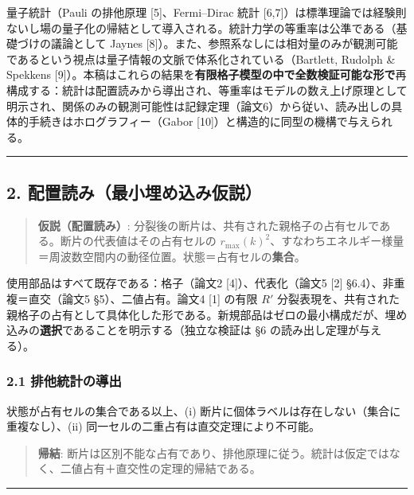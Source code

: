 \documentclass[
]{ltjsarticle}
\begin{document}
量子統計（Pauli の排他原理 {[}5{]}、Fermi--Dirac 統計
{[}6,7{]}）は標準理論では経験則ないし場の量子化の帰結として導入される。統計力学の等重率は公準である（基礎づけの議論として
Jaynes
{[}8{]}）。また、参照系なしには相対量のみが観測可能であるという視点は量子情報の文脈で体系化されている（Bartlett,
Rudolph \& Spekkens
{[}9{]}）。本稿はこれらの結果を\textbf{有限格子模型の中で全数検証可能な形で}再構成する：統計は配置読みから導出され、等重率はモデルの数え上げ原理として明示され、関係のみの観測可能性は記録定理（論文6）から従い、読み出しの具体的手続きはホログラフィー（Gabor
{[}10{]}）と構造的に同型の機構で与えられる。

\begin{center}\rule{0.5\linewidth}{0.5pt}\end{center}

\subsection{2.
配置読み（最小埋め込み仮説）}\label{ux914dux7f6eux8aadux307fux6700ux5c0fux57cbux3081ux8fbcux307fux4eeeux8aac}

\begin{quote}
\textbf{仮説（配置読み）}:
分裂後の断片は、共有された親格子の占有セルである。断片の代表値はその占有セルの
\(r_{\max}(k)^2\)、すなわちエネルギー様量＝周波数空間内の動径位置。状態＝占有セルの\textbf{集合}。
\end{quote}

使用部品はすべて既存である：格子（論文2 {[}4{]}）、代表化（論文5 {[}2{]}
§6.4）、非重複＝直交（論文5 §5）、二値占有。論文4 {[}1{]} の有限 \(R'\)
分裂表現を、共有された親格子の占有として具体化した形である。新規部品はゼロの最小構成だが、埋め込みの\textbf{選択}であることを明示する（独立な検証は
§6 の読み出し定理が与える）。

\subsubsection{2.1
排他統計の導出}\label{ux6392ux4ed6ux7d71ux8a08ux306eux5c0eux51fa}

状態が占有セルの集合である以上、(i)
断片に個体ラベルは存在しない（集合に重複なし）、(ii)
同一セルの二重占有は直交定理により不可能。

\begin{quote}
\textbf{帰結}:
断片は区別不能な占有であり、排他原理に従う。統計は仮定ではなく、二値占有＋直交性の定理的帰結である。
\end{quote}

\begin{center}\rule{0.5\linewidth}{0.5pt}\end{center}
\end{document}

